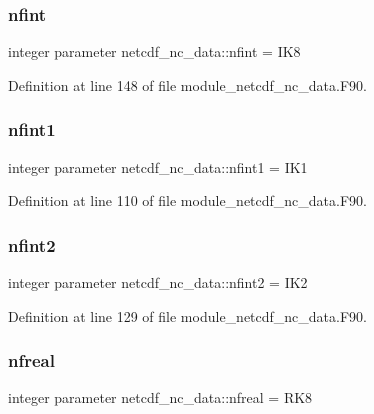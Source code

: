 \subsubsection{\texorpdfstring{nfint}{nfint}}
{\footnotesize\ttfamily integer parameter netcdf\+\_\+nc\+\_\+data\+::nfint = I\+K8}



Definition at line 148 of file module\+\_\+netcdf\+\_\+nc\+\_\+data.\+F90.

\mbox{\label{namespacenetcdf__nc__data_a3a80274c89dd79214673726d6d4fcb71}} 
\subsubsection{\texorpdfstring{nfint1}{nfint1}}
{\footnotesize\ttfamily integer parameter netcdf\+\_\+nc\+\_\+data\+::nfint1 = I\+K1}



Definition at line 110 of file module\+\_\+netcdf\+\_\+nc\+\_\+data.\+F90.

\mbox{\label{namespacenetcdf__nc__data_ade9f082f280165194fd84dbbc76d1ace}} 
\subsubsection{\texorpdfstring{nfint2}{nfint2}}
{\footnotesize\ttfamily integer parameter netcdf\+\_\+nc\+\_\+data\+::nfint2 = I\+K2}



Definition at line 129 of file module\+\_\+netcdf\+\_\+nc\+\_\+data.\+F90.

\mbox{\label{namespacenetcdf__nc__data_a38828b33e056b8b908849cb7db2528c0}} 
\subsubsection{\texorpdfstring{nfreal}{nfreal}}
{\footnotesize\ttfamily integer parameter netcdf\+\_\+nc\+\_\+data\+::nfreal = R\+K8}



